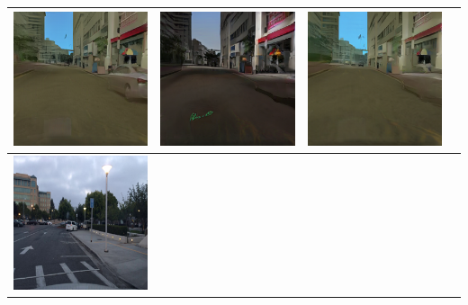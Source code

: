 \documentclass{VUMIFPSbakalaurinis}
\begin{document}
\begin{table}[H]
{\begin{tabular}{|c|c|c|c|}
            \includegraphics[scale=0.35]{img/pvz/6_cycle} & \includegraphics[scale=0.35]{img/pvz/6_cut} & \includegraphics[scale=0.35]{img/pvz/6_mspc}
            \\
            \hline
            \includegraphics[scale=0.35]{img/pvz/7_real} & 

\end{tabular}}
\end{table}
\end{document}

